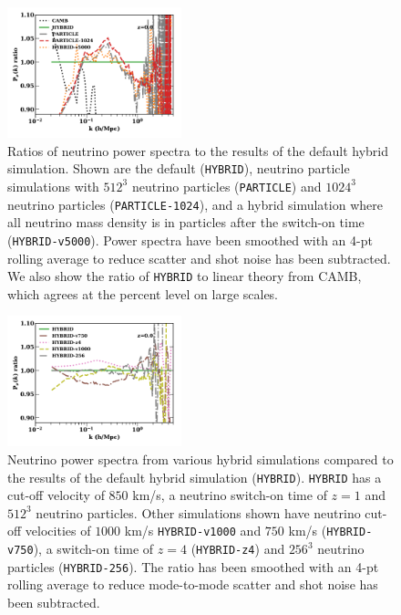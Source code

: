 \documentclass[useAMS, usenatbib]{mnras}
\begin{document}
\begin{figure}
  \includegraphics[width=0.45\textwidth]{nuplots/pks_nu_ckrel2-1.pdf}
    \caption{Ratios of neutrino power spectra to the results of the default hybrid simulation. Shown are the default (\texttt{HYBRID}), neutrino particle simulations with $512^3$ neutrino particles (\texttt{PARTICLE}) and $1024^3$ neutrino particles (\texttt{PARTICLE-1024}), and a hybrid simulation where all neutrino mass density is in particles after the switch-on time (\texttt{HYBRID-v5000}). Power spectra have been smoothed with an 4-pt rolling average to reduce scatter and shot noise has been subtracted. We also show the ratio of \texttt{HYBRID} to linear theory from CAMB, which agrees at the percent level on large scales.}
  \label{fig:hybparticle}
\end{figure}

\begin{figure}
  \includegraphics[width=0.45\textwidth]{nuplots/pks_nu_ckrel-1.pdf}
  \caption{Neutrino power spectra from various hybrid simulations compared to the results of the default hybrid simulation (\texttt{HYBRID}). \texttt{HYBRID} has a cut-off velocity of $850$ km/s, a neutrino switch-on time of $z=1$ and $512^3$ neutrino particles. Other simulations shown have neutrino cut-off velocities of $1000$ km/s \texttt{HYBRID-v1000} and $750$ km/s (\texttt{HYBRID-v750}), a switch-on time of $z=4$  (\texttt{HYBRID-z4}) and $256^3$ neutrino particles (\texttt{HYBRID-256}). The ratio has been smoothed with an 4-pt rolling average to reduce mode-to-mode scatter and shot noise has been subtracted.}
  \label{fig:vcrit}
\end{figure}
\end{document}
